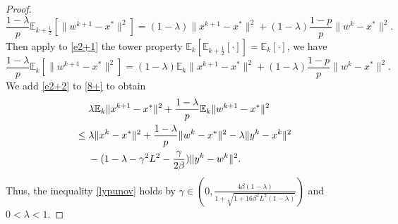 \documentclass[a4paper,12pt]{article}
\theoremstyle{definition}
\begin{document}
\begin{proof}
\begin{equation}
\label{e2+1}
\frac{1-\lambda}{p}\mathbb{E}_{k+\frac{1}{2}}[\|w^{k+1}-x^*\|^2]=(1-\lambda)\|x^{k+1}-x^*\|^2+(1-\lambda)\frac{1-p}{p}\|w^k-x^*\|^2.
\end{equation}
Then apply to \eqref{e2+1} the tower property $\mathbb{E}_k[\mathbb{E}_{k+\frac{1}{2}}[\cdot]]=\mathbb{E}_k[\cdot]$, we have
\begin{equation}
\label{e2+2}
\frac{1-\lambda}{p}\mathbb{E}_{k}[\|w^{k+1}-x^*\|^2]=(1-\lambda)\mathbb{E}_{k}\|x^{k+1}-x^*\|^2+(1-\lambda)\frac{1-p}{p}\|w^k-x^*\|^2.
\end{equation}
We add \eqref{e2+2} to \eqref{8+} to obtain
\begin{equation}
\label{10}
\aligned
&\ \ \ \ \lambda \mathbb{E}_k \|x^{k+1}-x^*\|^2+\frac{1-\lambda}{p} \mathbb{E}_k\|w^{k+1}-x^*\|^2\\
&\leq \lambda \|x^k-x^*\|^2+\frac{1-\lambda}{p}\|w^k-x^*\|^2-\lambda\|y^k-x^k\|^2 \\
& \ \ \ \ -(1-\lambda-\gamma^2L^2-\frac{\gamma}{2\beta})\|y^k-w^k\|^2.
\endaligned
\end{equation}
Thus, the inequality \eqref{lypunov} holds by $\gamma \in (0,\frac{4\beta(1-\lambda)}{1+\sqrt{1+16\beta^2L^2(1-\lambda)}})$ and $0<\lambda<1$.


\end{proof}
\end{document}
